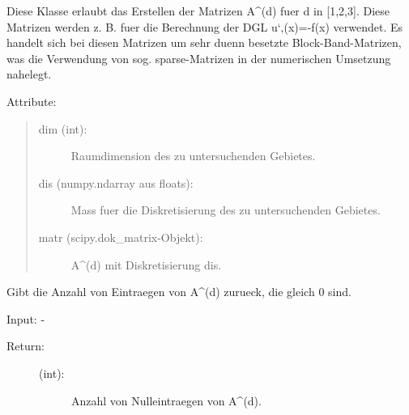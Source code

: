 \documentclass[letterpaper,10pt,ngerman]{sphinxmanual}
\begin{document}
\begin{fulllineitems}
\label{\detokenize{index:sparse_erw.Sparse}}
Diese Klasse erlaubt das Erstellen der Matrizen A\textasciicircum{}(d) fuer d in {[}1,2,3{]}. Diese Matrizen werden
z. B. fuer die Berechnung der DGL u‘‚(x)=-f(x) verwendet. Es handelt sich bei diesen Matrizen
um sehr duenn besetzte Block-Band-Matrizen, was die Verwendung von sog. sparse-Matrizen
in der numerischen Umsetzung nahelegt.

Attribute:
\begin{quote}
\begin{description}
\item[{dim (int):}] \leavevmode
Raumdimension des zu untersuchenden Gebietes.

\item[{dis (numpy.ndarray aus floats):}] \leavevmode
Mass fuer die Diskretisierung des zu untersuchenden Gebietes.

\item[{matr (scipy.dok\_matrix-Objekt):}] \leavevmode
A\textasciicircum{}(d) mit Diskretisierung dis.

\end{description}
\end{quote}

\begin{fulllineitems}
\label{\detokenize{index:sparse_erw.Sparse.anz_n_abs}}
Gibt die Anzahl von Eintraegen von A\textasciicircum{}(d) zurueck, die gleich 0 sind.

Input: -
\begin{description}
\item[{Return:}] \leavevmode\begin{description}
\item[{(int):}] \leavevmode
Anzahl von Nulleintraegen von A\textasciicircum{}(d).

\end{description}

\end{description}

\end{fulllineitems}



\end{fulllineitems}
\end{document}
